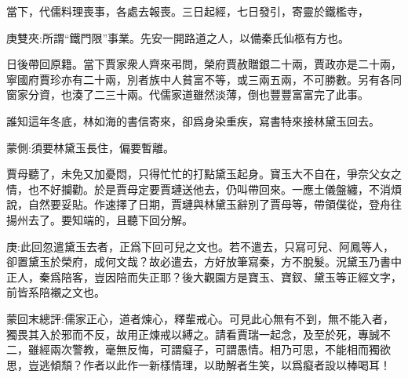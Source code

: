 \begin{parag}
    當下，代儒料理喪事，各處去報喪。三日起經，七日發引，寄靈於鐵檻寺，\begin{note}庚雙夾:所謂“鐵門限”事業。先安一開路道之人，以備秦氏仙柩有方也。\end{note}日後帶回原籍。當下賈家衆人齊來弔問，榮府賈赦贈銀二十兩，賈政亦是二十兩，寧國府賈珍亦有二十兩，別者族中人貧富不等，或三兩五兩，不可勝數。另有各同窗家分資，也湊了二三十兩。代儒家道雖然淡薄，倒也豐豐富富完了此事。
\end{parag}


\begin{parag}
    誰知這年冬底，林如海的書信寄來，卻爲身染重疾，寫書特來接林黛玉回去。\begin{note}蒙側:須要林黛玉長住，偏要暫離。\end{note}賈母聽了，未免又加憂悶，只得忙忙的打點黛玉起身。寶玉大不自在，爭奈父女之情，也不好攔勸。於是賈母定要賈璉送他去，仍叫帶回來。一應土儀盤纏，不消煩說，自然要妥貼。作速擇了日期，賈璉與林黛玉辭別了賈母等，帶領僕從，登舟往揚州去了。要知端的，且聽下回分解。
\end{parag}


\begin{parag}
    \begin{note}庚:此回忽遣黛玉去者，正爲下回可兒之文也。若不遣去，只寫可兒、阿鳳等人，卻置黛玉於榮府，成何文哉？故必遣去，方好放筆寫秦，方不脫髮。況黛玉乃書中正人，秦爲陪客，豈因陪而失正耶？後大觀園方是寶玉、寶釵、黛玉等正經文字，前皆系陪襯之文也。\end{note}
\end{parag}


\begin{parag}
    \begin{note}蒙回末總評:儒家正心，道者煉心，釋輩戒心。可見此心無有不到，無不能入者，獨畏其入於邪而不反，故用正煉戒以縛之。請看賈瑞一起念，及至於死，專誠不二，雖經兩次警教，毫無反悔，可謂癡子，可謂愚情。相乃可思，不能相而獨欲思，豈逃傾頹？作者以此作一新樣情理，以助解者生笑，以爲癡者設以棒喝耳！\end{note}
\end{parag}